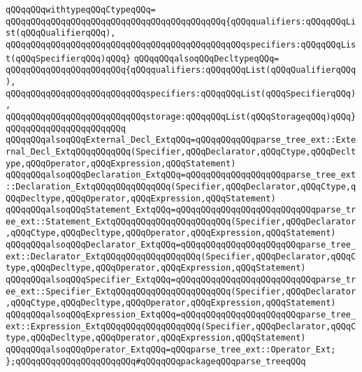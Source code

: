 \verb|qQQqqQQqwithtypeqQQqCtypeqQQq=|\newline
\verb|qQQqqQQqqQQqqQQqqQQqqQQqqQQqqQQqqQQqqQQqqQQq{qQQqqualifiers:qQQqqQQqList(qQQqQualifierqQQq),|\newline
\verb|qQQqqQQqqQQqqQQqqQQqqQQqqQQqqQQqqQQqqQQqqQQqqQQqspecifiers:qQQqqQQqList(qQQqSpecifierqQQq)qQQq}|\newline
\verb|qQQqqQQqalsoqQQqDecltypeqQQq=|\newline
\verb|qQQqqQQqqQQqqQQqqQQqqQQq{qQQqqualifiers:qQQqqQQqList(qQQqQualifierqQQq),|\newline
\verb|qQQqqQQqqQQqqQQqqQQqqQQqqQQqspecifiers:qQQqqQQqList(qQQqSpecifierqQQq),|\newline
\verb|qQQqqQQqqQQqqQQqqQQqqQQqqQQqstorage:qQQqqQQqList(qQQqStorageqQQq)qQQq}qQQqqQQqqQQqqQQqqQQqqQQq|\newline
\newline
\verb|qQQqqQQqalsoqQQqExternal_Decl_ExtqQQq=qQQqqQQqqQQqparse_tree_ext::External_Decl_ExtqQQqqQQqqQQq(Specifier,qQQqDeclarator,qQQqCtype,qQQqDecltype,qQQqOperator,qQQqExpression,qQQqStatement)|\newline
\verb|qQQqqQQqalsoqQQqDeclaration_ExtqQQq=qQQqqQQqqQQqqQQqqQQqparse_tree_ext::Declaration_ExtqQQqqQQqqQQqqQQq(Specifier,qQQqDeclarator,qQQqCtype,qQQqDecltype,qQQqOperator,qQQqExpression,qQQqStatement)|\newline
\verb|qQQqqQQqalsoqQQqStatement_ExtqQQq=qQQqqQQqqQQqqQQqqQQqqQQqqQQqparse_tree_ext::Statement_ExtqQQqqQQqqQQqqQQqqQQqqQQq(Specifier,qQQqDeclarator,qQQqCtype,qQQqDecltype,qQQqOperator,qQQqExpression,qQQqStatement)|\newline
\verb|qQQqqQQqalsoqQQqDeclarator_ExtqQQq=qQQqqQQqqQQqqQQqqQQqqQQqparse_tree_ext::Declarator_ExtqQQqqQQqqQQqqQQqqQQq(Specifier,qQQqDeclarator,qQQqCtype,qQQqDecltype,qQQqOperator,qQQqExpression,qQQqStatement)|\newline
\verb|qQQqqQQqalsoqQQqSpecifier_ExtqQQq=qQQqqQQqqQQqqQQqqQQqqQQqqQQqparse_tree_ext::Specifier_ExtqQQqqQQqqQQqqQQqqQQqqQQq(Specifier,qQQqDeclarator,qQQqCtype,qQQqDecltype,qQQqOperator,qQQqExpression,qQQqStatement)|\newline
\verb|qQQqqQQqalsoqQQqExpression_ExtqQQq=qQQqqQQqqQQqqQQqqQQqqQQqparse_tree_ext::Expression_ExtqQQqqQQqqQQqqQQqqQQq(Specifier,qQQqDeclarator,qQQqCtype,qQQqDecltype,qQQqOperator,qQQqExpression,qQQqStatement)|\newline
\newline
\newline
\verb|qQQqqQQqalsoqQQqOperator_ExtqQQq=qQQqparse_tree_ext::Operator_Ext;|\newline
\newline
\verb|};qQQqqQQqqQQqqQQqqQQqqQQq#qQQqqQQqpackageqQQqparse_treeqQQq|\newline
\newline

